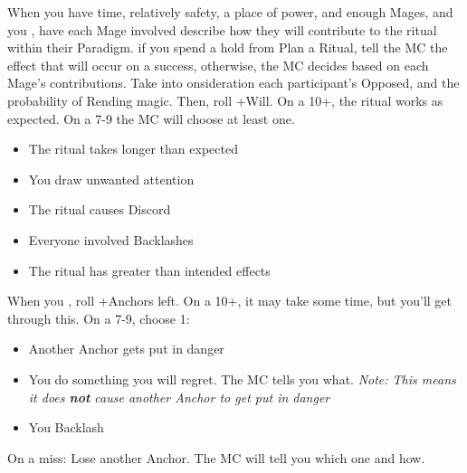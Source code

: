 \begin{multicols}{3}
  \SEPARATOR

  \begin{move}
    When you have time, relatively safety, a place of power, and
    enough Mages, and you , have each Mage
    involved describe how they will contribute to the ritual within
    their Paradigm. if you spend a hold from Plan a Ritual, tell the
    MC the effect that will occur on a success, otherwise, the MC
    decides based on each Mage's contributions. Take into onsideration
    each participant's Opposed, and the probability of Rending
    magic. Then, roll +Will. On a 10+, the ritual works as
    expected. On a 7-9 the MC will choose at least one.
    \begin{itemize}
      \setlength\itemsep{0em}
    \item The ritual takes longer than expected
    \item You draw unwanted attention
    \item The ritual causes Discord
    \item Everyone involved Backlashes
    \item The ritual has greater than intended effects
    \end{itemize}
  \end{move}

  \SEPARATOR

  \begin{move}
    When you , roll +Anchors left. On a 10+,
    it may take some time, but you'll get through this. On a 7-9,
    choose 1:
    \begin{itemize}
      \setlength\itemsep{0em}
    \item Another Anchor gets put in danger
    \item You do something you will regret. The MC tells you
      what. \textit{Note: This means it does \textbf{not} cause
        another Anchor to get put in danger}
      \item You Backlash
    \end{itemize}
    On a miss: Lose another Anchor. The MC will tell you which one and
    how.
  \end{move}

  \columnbreak


\end{multicols}
